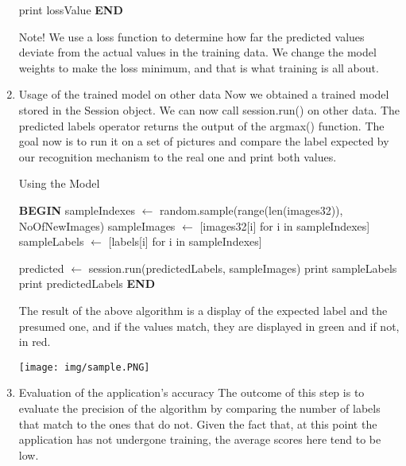 \documentclass[runningheads,a4paper,11pt]{report}
\begin{document}
\begin{enumerate}
\begin{algorithm}
\begin{algorithmic}
  					\STATE print lossValue
  				\ENDIF
  			\ENDFOR
\STATE \textbf{END}
\end{algorithmic}
\end{algorithm}

Note! We use a loss function to determine how far the predicted values deviate from the actual values in the training data. We change the model weights to make the loss minimum, and that is what training is all about.

 \item Usage of the trained model on other data
 Now we obtained a trained model stored in the Session object. We can now call session.run() on other data. The predicted labels operator returns the output of the argmax() function. The goal now is to run it on a set of pictures and compare the label expected by our recognition mechanism to the real one and print both values.
 
 \begin{algorithm}
	\caption{Using the Model}
		\begin{algorithmic}
			\STATE \textbf{BEGIN}
  		\STATE sampleIndexes $\leftarrow$ random.sample(range(len(images32)), NoOfNewImages)
        \STATE sampleImages $\leftarrow$ [images32[i] for i in sampleIndexes]
        \STATE sampleLabels $\leftarrow$ [labels[i] for i in sampleIndexes]
        
        \STATE predicted $\leftarrow$ session.run(predictedLabels, sampleImages)
        \STATE print sampleLabels
        \STATE print predictedLabels
  		\STATE \textbf{END}
\end{algorithmic}
\end{algorithm}

The result of the above algorithm is a display of the expected label and the presumed one, and if the values match, they are displayed in green and if not, in red.

\texttt{[image: img/sample.PNG]}
 
  \item Evaluation of the application's accuracy
  The outcome of this step is to evaluate the precision of the algorithm by comparing the number of labels that match to the ones that do not. Given the fact that, at this point the application has not undergone training, the average scores here tend to be low.
  
\end{enumerate}
\end{document}
